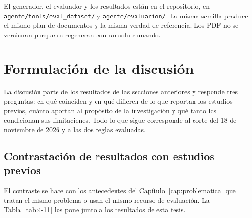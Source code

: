 El generador, el evaluador y los resultados están en el repositorio, en \texttt{agente/\allowbreak{}tools/\allowbreak{}eval\_dataset/} y \texttt{agente/\allowbreak{}evaluacion/}. La misma semilla produce el mismo plan de documentos y la misma verdad de referencia. Los PDF no se versionan porque se regeneran con un solo comando.

\section{Formulación de la discusión}\label{sec:discusion}

La discusión parte de los resultados de las secciones anteriores y responde tres preguntas: en qué coinciden y en qué difieren de lo que reportan los estudios previos, cuánto aportan al propósito de la investigación y qué tanto los condicionan sus limitaciones. Todo lo que sigue corresponde al corte del 18 de noviembre de 2026 y a las dos reglas evaluadas.

\subsection{Contrastación de resultados con estudios previos}

El contraste se hace con los antecedentes del Capítulo~\ref{cap:problematica} que tratan el mismo problema o usan el mismo recurso de evaluación. La Tabla~\ref{tab:4-11} los pone junto a los resultados de esta tesis.


